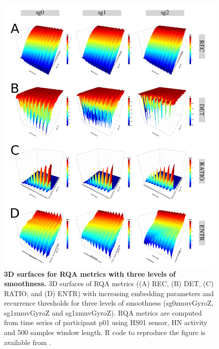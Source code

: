\begin{figure}[!ht]
\centering
\includegraphics[width=1.0\textwidth]{s}
    \caption{
	{\bf 3D surfaces for RQA metrics with three levels of smoothness.}
	3D surfaces of RQA metrics ((A) REC, (B) DET, (C) RATIO, and (D) ENTR) 
	with increasing embedding parameters and recurrence thresholds for 
	three levels of smoothness 
	(sg0zmuvGyroZ, sg1zmuvGyroZ and sg1zmuvGyroZ).
	RQA metrics are computed from time series of participant p01 using 
	HS01 sensor, HN activity and 500 samples window length.
	R code to reproduce the figure is available from \cite{hwum2018}.
 }
\label{fig:topo_smoothness}
\end{figure}



